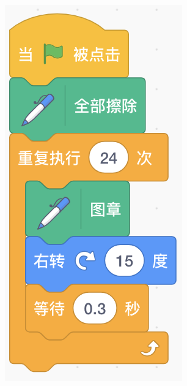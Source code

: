 \documentclass[10pt, a4paper]{article}
\begin{document}
\begin{enumerate}
\begin{figure}[htbp]
\begin{minipage}[t]{.33\textwidth}
\begin{minipage}[t]{.33\textwidth}
                    \centering
                    \includegraphics[width=\textwidth]{14-1.png}
                \end{minipage}

\end{minipage}
\end{figure}
\end{enumerate}
\end{document}
